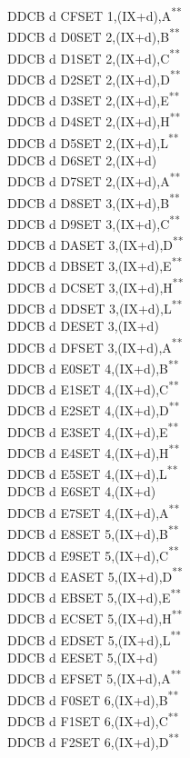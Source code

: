\documentclass[12pt,twoside,openright,a4paper]{book}
\newcommand{\UNDOC}{\textnormal{\textsuperscript{**}}}
\begin{document}
\begin{multicols}{3}
{\begin{tabbing}
	DDCB d CF\>SET 1,(IX+d),A\UNDOC\\
	DDCB d D0\>SET 2,(IX+d),B\UNDOC\\
	DDCB d D1\>SET 2,(IX+d),C\UNDOC\\
	DDCB d D2\>SET 2,(IX+d),D\UNDOC\\
	DDCB d D3\>SET 2,(IX+d),E\UNDOC\\
	DDCB d D4\>SET 2,(IX+d),H\UNDOC\\
	DDCB d D5\>SET 2,(IX+d),L\UNDOC\\
	DDCB d D6\>SET 2,(IX+d)\\
	DDCB d D7\>SET 2,(IX+d),A\UNDOC\\
	DDCB d D8\>SET 3,(IX+d),B\UNDOC\\
	DDCB d D9\>SET 3,(IX+d),C\UNDOC\\
	DDCB d DA\>SET 3,(IX+d),D\UNDOC\\
	DDCB d DB\>SET 3,(IX+d),E\UNDOC\\
	DDCB d DC\>SET 3,(IX+d),H\UNDOC\\
	DDCB d DD\>SET 3,(IX+d),L\UNDOC\\
	DDCB d DE\>SET 3,(IX+d)\\
	DDCB d DF\>SET 3,(IX+d),A\UNDOC\\
	DDCB d E0\>SET 4,(IX+d),B\UNDOC\\
	DDCB d E1\>SET 4,(IX+d),C\UNDOC\\
	DDCB d E2\>SET 4,(IX+d),D\UNDOC\\
	DDCB d E3\>SET 4,(IX+d),E\UNDOC\\
	DDCB d E4\>SET 4,(IX+d),H\UNDOC\\
	DDCB d E5\>SET 4,(IX+d),L\UNDOC\\
	DDCB d E6\>SET 4,(IX+d)\\
	DDCB d E7\>SET 4,(IX+d),A\UNDOC\\
	DDCB d E8\>SET 5,(IX+d),B\UNDOC\\
	DDCB d E9\>SET 5,(IX+d),C\UNDOC\\
	DDCB d EA\>SET 5,(IX+d),D\UNDOC\\
	DDCB d EB\>SET 5,(IX+d),E\UNDOC\\
	DDCB d EC\>SET 5,(IX+d),H\UNDOC\\
	DDCB d ED\>SET 5,(IX+d),L\UNDOC\\
	DDCB d EE\>SET 5,(IX+d)\\
	DDCB d EF\>SET 5,(IX+d),A\UNDOC\\
	DDCB d F0\>SET 6,(IX+d),B\UNDOC\\
	DDCB d F1\>SET 6,(IX+d),C\UNDOC\\
	DDCB d F2\>SET 6,(IX+d),D\UNDOC\\

\end{tabbing}}
\end{multicols}
\end{document}
